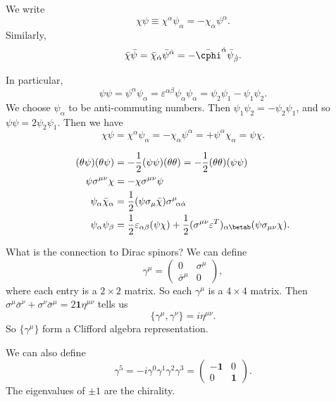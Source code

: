 \documentclass[a4paper]{article}
\begin{document}
\begin{notation}
  We write
  \[
    \chi\psi \equiv \chi^\alpha \psi_\alpha = - \chi_\alpha \psi^\alpha.
  \]
  Similarly,
  \[
    \bar{\chi} \bar{\psi} = \bar{\chi}_{\dot{\alpha}} \bar\psi^{\dot{\alpha}} = - \bar{\cphi}^{\dot{\alpha}} \bar{\psi}_{\dot{\beta}}.
  \]
\end{notation}
In particular,
\[
  \psi\psi = \psi^\alpha \psi_\alpha = \varepsilon^{\alpha\beta} \psi_\alpha \psi_\alpha = \psi_2 \psi_1 - \psi_1 \psi_2.
\]
We choose $\psi_\alpha$ to be anti-commuting numbers. Then $\psi_1 \psi_2 = - \psi_2 \psi_1$, and so $\psi \psi = 2 \psi_2 \psi_1$. Then we have
\[
  \chi \psi = \chi^\alpha \psi_\alpha = - \chi_\alpha \psi^\alpha = + \psi^\alpha \chi_\alpha = \psi \chi.
\]
\begin{prop}
  \begin{align*}
    (\theta \psi) (\theta \psi) &= - \frac{1}{2} (\psi \psi) (\theta \theta) = - \frac{1}{2} (\theta \theta)(\psi \psi)\\
    \psi \sigma^{\mu\nu} \chi &= - \chi \sigma^{\mu\nu} \psi\\
    \psi_\alpha \bar{\chi}_\alpha &= \frac{1}{2} (\psi \sigma_\mu \bar{\chi}) \sigma^\mu\!_{\alpha \dot{\alpha}}\\
    \psi_\alpha \psi_\beta &= \frac{1}{2} \varepsilon_{\alpha\beta} (\psi \chi) + \frac{1}{2} (\sigma^{\mu\nu} \varepsilon^T)_{\alpha\betab} (\psi \sigma_{\mu\nu} \chi).
  \end{align*}
\end{prop}

What is the connection to Dirac spinors? We can define
\[
  \gamma^\mu = 
  \begin{pmatrix}
    0 & \sigma^\mu\\
    \bar{\sigma}^\mu & 0
  \end{pmatrix},
\]
where each entry is a $2 \times 2$ matrix. So each $\gamma^\mu$ is a $4 \times 4$ matrix. Then $\sigma^\mu \bar{\sigma}^\nu + \sigma^\nu \bar{\sigma}^\mu = 2\mathbf{1}\eta^{\mu\nu}$ tells us
\[
  \{\gamma^\mu, \gamma^\nu\} = i \eta^{\mu\nu}.
\]
So $\{\gamma^\mu\}$ form a Clifford algebra representation.

We can also define
\[
  \gamma^5 = -i \gamma^0 \gamma^1 \gamma^2 \gamma^3 =
  \begin{pmatrix}
    -\mathbf{1} & 0\\
    0 & \mathbf{1}
  \end{pmatrix}.
\]
The eigenvalues of $\pm 1$ are the chirality.
\end{document}
